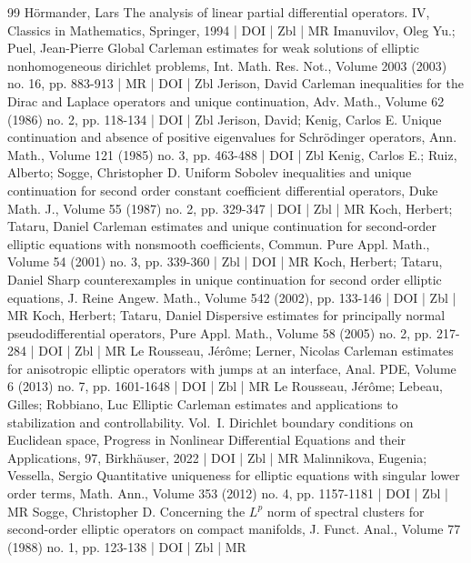 \begin{thebibliography}{99}
 Hörmander, Lars The analysis of linear partial differential operators. IV, Classics in Mathematics, Springer, 1994 | DOI | Zbl | MR
 Imanuvilov, Oleg Yu.; Puel, Jean-Pierre Global Carleman estimates for weak solutions of elliptic nonhomogeneous dirichlet problems, Int. Math. Res. Not., Volume 2003 (2003) no. 16, pp. 883-913 | MR | DOI | Zbl
 Jerison, David Carleman inequalities for the Dirac and Laplace operators and unique continuation, Adv. Math., Volume 62 (1986) no. 2, pp. 118-134 | DOI | Zbl
 Jerison, David; Kenig, Carlos E. Unique continuation and absence of positive eigenvalues for Schrödinger operators, Ann. Math., Volume 121 (1985) no. 3, pp. 463-488 | DOI | Zbl
 Kenig, Carlos E.; Ruiz, Alberto; Sogge, Christopher D. Uniform Sobolev inequalities and unique continuation for second order constant coefficient differential operators, Duke Math. J., Volume 55 (1987) no. 2, pp. 329-347 | DOI | Zbl | MR
 Koch, Herbert; Tataru, Daniel Carleman estimates and unique continuation for second-order elliptic equations with nonsmooth coefficients, Commun. Pure Appl. Math., Volume 54 (2001) no. 3, pp. 339-360 | Zbl | DOI | MR
 Koch, Herbert; Tataru, Daniel Sharp counterexamples in unique continuation for second order elliptic equations, J. Reine Angew. Math., Volume 542 (2002), pp. 133-146 | DOI | Zbl | MR
 Koch, Herbert; Tataru, Daniel Dispersive estimates for principally normal pseudodifferential operators, Pure Appl. Math., Volume 58 (2005) no. 2, pp. 217-284 | DOI | Zbl | MR
 Le Rousseau, Jérôme; Lerner, Nicolas Carleman estimates for anisotropic elliptic operators with jumps at an interface, Anal. PDE, Volume 6 (2013) no. 7, pp. 1601-1648 | DOI | Zbl | MR
 Le Rousseau, Jérôme; Lebeau, Gilles; Robbiano, Luc Elliptic Carleman estimates and applications to stabilization and controllability. Vol. I. Dirichlet boundary conditions on Euclidean space, Progress in Nonlinear Differential Equations and their Applications, 97, Birkhäuser, 2022 | DOI | Zbl | MR
 Malinnikova, Eugenia; Vessella, Sergio Quantitative uniqueness for elliptic equations with singular lower order terms, Math. Ann., Volume 353 (2012) no. 4, pp. 1157-1181 | DOI | Zbl | MR
 Sogge, Christopher D. Concerning the ${L}^p$ norm of spectral clusters for second-order elliptic operators on compact manifolds, J. Funct. Anal., Volume 77 (1988) no. 1, pp. 123-138 | DOI | Zbl | MR

\end{thebibliography}
